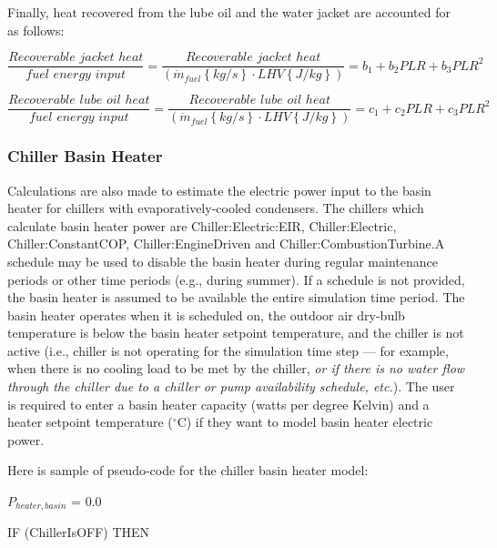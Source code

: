 Finally, heat recovered from the lube oil and the water jacket are accounted for as follows:

\begin{equation}
\frac{{Recoverable\,\,jacket\,\,heat}}{{fuel\,\,energy\,\,input}} = \frac{{Recoverable\,\,jacket\,\,heat}}{{\left( {{{\dot m}_{fuel}}\left\{ {kg/s} \right\} \cdot LHV\left\{ {J/kg} \right\}} \right)}} = {b_1} + {b_2}PLR + {b_3}PL{R^2}
\end{equation}

\begin{equation}
\frac{{Recoverable\,\,lube\,\,oil\,\,heat}}{{fuel\,\,energy\,\,input}} = \frac{{Recoverable\,\,lube\,\,oil\,\,heat}}{{\left( {{{\dot m}_{fuel}}\left\{ {kg/s} \right\} \cdot LHV\left\{ {J/kg} \right\}} \right)}} = {c_1} + {c_2}PLR + {c_3}PL{R^2}
\end{equation}

\subsubsection{Chiller Basin Heater}\label{chiller-basin-heater-3}

Calculations are also made to estimate the electric power input to the basin heater for chillers with evaporatively-cooled condensers. The chillers which calculate basin heater power are Chiller:Electric:EIR, Chiller:Electric, Chiller:ConstantCOP, Chiller:EngineDriven and Chiller:CombustionTurbine.A schedule may be used to disable the basin heater during regular maintenance periods or other time periods (e.g., during summer). If a schedule is not provided, the basin heater is assumed to be available the entire simulation time period. The basin heater operates when it is scheduled on, the outdoor air dry-bulb temperature is below the basin heater setpoint temperature, and the chiller is not active (i.e., chiller is not operating for the simulation time step --- for example, when there is no cooling load to be met by the chiller, \emph{or if there is no water flow through the chiller due to a chiller or pump availability schedule, etc.}). The user is required to enter a basin heater capacity (watts per degree Kelvin) and a heater setpoint temperature (\(^{\circ}\)C) if they want to model basin heater electric power.

Here is sample of pseudo-code for the chiller basin heater model:

\(P_{heater,basin}\) = 0.0

IF (ChillerIsOFF) THEN

